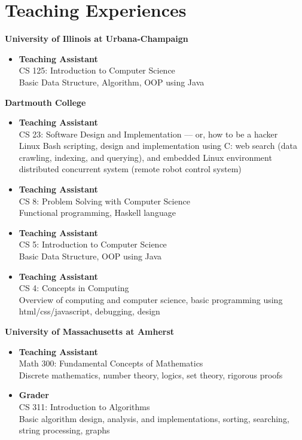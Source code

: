 \section{\sc Teaching Experiences}

{\bf University of Illinois at Urbana-Champaign}
\begin{itemize}
\item {\bf Teaching Assistant} \\ CS 125: Introduction to Computer
  Science \\ Basic Data Structure, Algorithm, OOP using Java
\end{itemize}

{\bf Dartmouth College}
\begin{itemize}
\item {\bf Teaching Assistant} \\ CS 23: Software Design and
  Implementation --– or, how to be a hacker \\ Linux Bash scripting,
  design and implementation using C: web search (data crawling,
  indexing, and querying), and embedded Linux environment distributed
  concurrent system (remote robot control system)
\item {\bf Teaching Assistant} \\ CS 8: Problem Solving with Computer
  Science \\ Functional programming, Haskell language
\item {\bf Teaching Assistant} \\ CS 5: Introduction to Computer
  Science \\ Basic Data Structure, OOP using Java
\item {\bf Teaching Assistant} \\ CS 4: Concepts in Computing
  \\ Overview of computing and computer science, basic programming
  using html/css/javascript, debugging, design
\end{itemize}

{\bf University of Massachusetts at Amherst}
\begin{itemize}
\item {\bf Teaching Assistant} \\ Math 300: Fundamental Concepts of
  Mathematics \\ Discrete mathematics, number theory, logics, set
  theory, rigorous proofs
\item {\bf Grader} \\ CS 311: Introduction to Algorithms \\ Basic
  algorithm design, analysis, and implementations, sorting, searching,
  string processing, graphs
\end{itemize}
